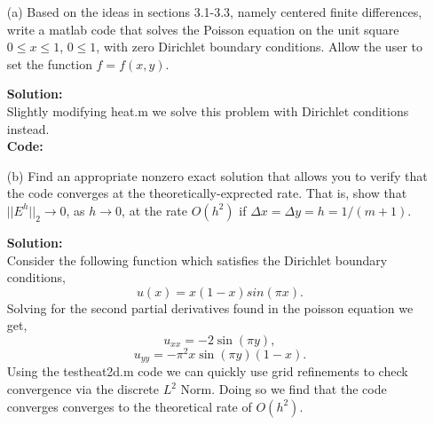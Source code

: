 \documentclass[12pt]{article}
\makeatletter
\theoremstyle{homework}
\newenvironment{exercise}[1]
{\def\@currentlabel{#1}\exercisecore}
{\endexercisecore}
\newcommand{\localhead}[1]{\par\smallskip\noindent\textbf{#1}\nobreak\\}%
\newcommand\solution{\localhead{Solution:}}
\makeatother
\begin{document}
\begin{exercise}{Proeblem P21} 
  \begin{enumerate}
    \item[(a)] Based on the ideas in sections 3.1-3.3, namely centered finite differences, write a matlab code that 
    solves the Poisson equation on the unit square $0 \leq x \leq 1$, $0 \leq 1$, with zero Dirichlet boundary conditions. Allow 
    the user to set the function $f = f(x, y)$. 
    \solution Slightly modifying heat.m we solve this problem with Dirichlet conditions instead. \\
      
  \textbf{Code:}
  \begin{center}
    
  \end{center}


  \item[(b)] Find an appropriate nonzero exact solution that allows you to verify that the code converges at the theoretically-exprected
  rate. That is, show that $||E^h||_2 \to 0$, as $h \to 0$, at the rate $O(h^2)$ if $\Delta x = \Delta y = h = 1/(m + 1)$. 
  \solution Consider the following function which satisfies the Dirichlet boundary conditions, 
  \begin{equation*}
    u(x) = x(1 - x)sin(\pi x).
  \end{equation*}
  Solving for the second partial derivatives found in the poisson equation we get, 
  \begin{equation*}
    u_{xx} = -2\sin \left(\pi y\right),
  \end{equation*}
  \begin{equation*}
    u_{yy} = -\pi ^2x\sin \left(\pi y\right)\left(1-x\right).
  \end{equation*}
  Using the testheat2d.m code we can quickly use grid refinements to check convergence via the discrete $L^2$ Norm. Doing so we find that the code converges 
  converges to the theoretical rate of $O(h^2)$. 
     

\end{enumerate}
\end{exercise}
\end{document}
